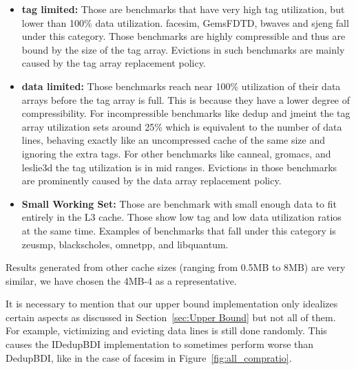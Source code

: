 \begin{itemize}
    \item \textbf{tag limited:} Those are benchmarks that have very high tag utilization, but lower than 100\% data utilization. facesim, GemsFDTD, bwaves and sjeng fall under this category. Those benchmarks are highly compressible and thus are bound by the size of the tag array. Evictions in such benchmarks are mainly caused by the tag array replacement policy.
    \item \textbf{data limited:} Those benchmarks reach near 100\% utilization of their data arrays before the tag array is full. This is because they have a lower degree of compressibility. For incompressible benchmarks like dedup and jmeint the tag array utilization sets around 25\% which is equivalent to the number of data lines, behaving exactly like an uncompressed cache of the same size and ignoring the extra tags. For other benchmarks like canneal, gromacs, and leslie3d the tag utilization is in mid ranges. Evictions in those benchmarks are prominently caused by the data array replacement policy.
    \item \textbf{Small Working Set:} Those are benchmark with small enough data to fit entirely in the L3 cache. Those show low tag and low data utilization ratios at the same time. Examples of benchmarks that fall under this category is zeusmp, blackscholes, omnetpp, and libquantum.
\end{itemize}
Results generated from other cache sizes (ranging from 0.5MB to 8MB) are very similar, we have chosen the 4MB-4 as a representative.\par
It is necessary to mention that our upper bound implementation only idealizes certain aspects as discussed in Section~\ref{sec:Upper Bound} but not all of them. For example, victimizing and evicting data lines is still done randomly. This causes the IDedupBDI implementation to sometimes perform worse than DedupBDI, like in the case of facesim in Figure~\ref{fig:all_compratio}.

